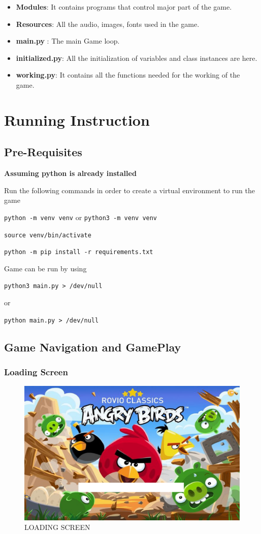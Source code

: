 \documentclass{article}
\begin{document}
\begin{itemize}
    \item \textbf{Modules}: It contains programs that control major part of the game.
    \item \textbf{Resources}: All the audio, images, fonts used in the game.
    \item \textbf{main.py} : The main Game loop.
    \item \textbf{initialized.py}: All the initialization of variables and class instances are here.
    \item \textbf{working.py}: It contains all the functions needed for the working of the game.
\end{itemize}

\section{Running Instruction}
\subsection{Pre-Requisites}
\textbf{Assuming python is already installed}

Run the following commands in order to create a virtual environment to run the game

\texttt{python -m venv venv} or \texttt{python3 -m venv venv}

\texttt{source venv/bin/activate}

\texttt{python -m pip install -r requirements.txt}

Game can be run by using

\texttt{python3 main.py > /dev/null}

or

\texttt{python main.py > /dev/null}

\subsection{Game Navigation and GamePlay}
\subsubsection{Loading Screen}
\begin{figure}[h!]
    \centering
    \includegraphics[width = 1.0\textwidth]{loading_screen.png}
    \caption{LOADING SCREEN}
    \label{fig:LOADING SCREEN}
\end{figure}
\end{document}
